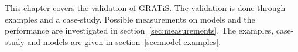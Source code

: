 This chapter covers the validation of GRATiS. The validation is done through examples and a case-study. Possible measurements on models and the performance are investigated in section~\ref{sec:measurements}. The examples, case-study and models are given in section~\ref{sec:model-examples}.

